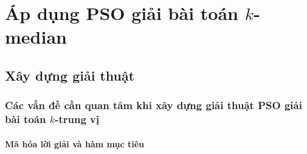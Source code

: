 
\section{Áp dụng PSO giải bài toán $k$-median}

\subsection{Xây dựng giải thuật}

\begin{frame}
  \frametitle{Các vấn đề cần quan tâm khi xây dựng giải thuật PSO giải bài toán $k$-trung vị}
  \framesubtitle{Mã hóa lời giải và hàm mục tiêu}
  

\end{frame}
